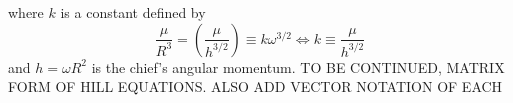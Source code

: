 	\noindent where $k$ is a constant defined by 
	\[
	\dfrac{\mu}{R^3} = \left(\dfrac{\mu }{h^{3/2}}\right) \equiv k \omega^{3/2} \Leftrightarrow k \equiv \dfrac{\mu} {h^{3/2}}
	\]
	\indent and $h = \omega R^2$ is the chief's angular momentum. TO BE CONTINUED, MATRIX FORM OF HILL EQUATIONS. ALSO ADD VECTOR NOTATION OF EACH